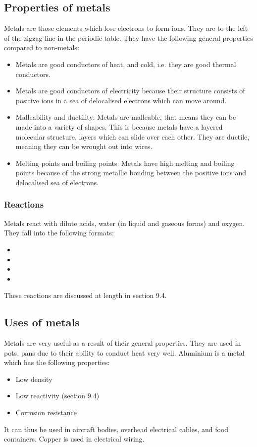 \documentclass{article}
\begin{document}
\subsection{Properties of metals}
Metals are those elements which lose electrons to form ions. They are to the left of
the zigzag line in the periodic table. They have the following general properties 
compared to non-metals:
\begin{itemize}
	\item Metals are good conductors of heat, and cold, i.e. they are good thermal
		conductors.
	\item Metals are good conductors of electricity because their structure consists
		of positive ions in a sea of delocalised electrons which can move around.
	\item Malleability and ductility: Metals are malleable, that means they can be 
		made into a variety of shapes. This is because metals have a layered molecular
		structure, layers which can slide over each other. They are ductile, meaning 
		they can be wrought out into wires.
	\item Melting points and boiling points: Metals have high melting and boiling points
		because of the strong metallic bonding between the positive ions and delocalised
		sea of electrons.
\end{itemize}
\subsubsection*{Reactions}
Metals react with dilute acids, water (in liquid and gaseous forms) and oxygen. They
fall into the following formats:
\begin{itemize}
	\item {}
	\item {}
	\item {}
	\item {}
\end{itemize}
These reactions are discussed at length in section 9.4.
\subsection{Uses of metals}
Metals are very useful as a result of their general properties. They are used in pots,
pans due to their ability to conduct heat very well. Aluminium is a metal which has the
following properties:
\begin{itemize}
	\item Low density
	\item Low reactivity (section 9.4)
	\item Corrosion resistance
\end{itemize}
It can thus be used in aircraft bodies, overhead electrical cables, and food containers.
Copper is used in electrical wiring.
\end{document}
